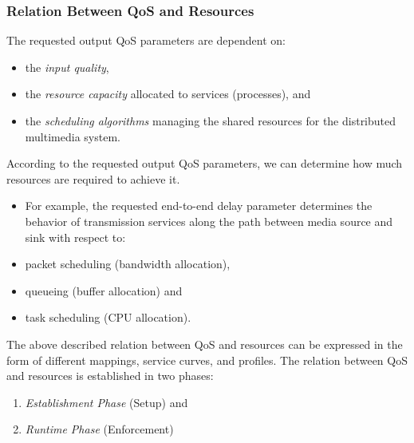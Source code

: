 \subsubsection*{Relation Between QoS and Resources}

The requested output QoS parameters are dependent on:
\begin{itemize}
	\item the \textit{input quality}, 
	\item the \textit{resource capacity} allocated to services (processes), and 
	\item the \textit{scheduling algorithms} managing the shared resources for the distributed multimedia system.
\end{itemize}
 

According to the requested output QoS parameters, we can determine how much resources are required to achieve it. 
\begin{itemize}
	\item For example, the requested end-to-end delay parameter determines the behavior of transmission services along the path between media source and sink with respect to:
	\item packet scheduling (bandwidth allocation),
	\item queueing (buffer allocation) and 
	\item task scheduling (CPU allocation).
\end{itemize}


The above described relation between QoS and resources can be expressed in the form of different mappings, service curves, and profiles. The relation between QoS and
resources is established in two phases:

\begin{enumerate}
	\item \textit{Establishment Phase} (Setup) and
	\item \textit{Runtime Phase} (Enforcement)
\end{enumerate}



